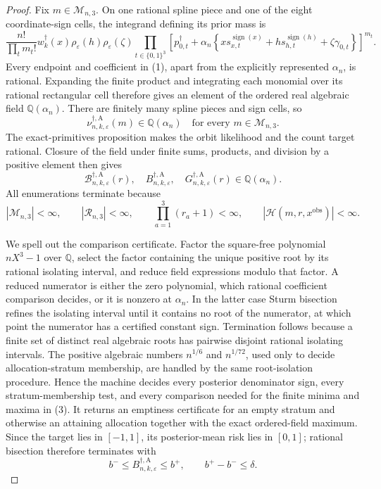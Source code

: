 \documentclass{article}
\begin{document}
{\begin{proof}
Fix \(m\in\mathcal M_{n,3}\).  On one rational spline piece and one of the eight
coordinate-sign cells, the integrand defining its prior mass is
\[
 \frac{n!}{\prod_tm_t!}
 w_k^\dagger(x)\rho_\varepsilon(h)\rho_\varepsilon(\zeta)
 \prod_{t\in\{0,1\}^3}
 \left[p_{0,t}^\dagger+\alpha_n
 \left\{xs_{x,t}^{\operatorname{sign}(x)}
 +hs_{h,t}^{\operatorname{sign}(h)}+\zeta\gamma_{0,t}\right\}
 \right]^{m_t}.
\tag{1}
\]
Every endpoint and coefficient in (1), apart from the explicitly represented
\(\alpha_n\), is rational.  Expanding the finite product and integrating each
monomial over its rational rectangular cell therefore gives an element of the
ordered real algebraic field \(\mathbb Q(\alpha_n)\).  There are finitely many
spline pieces and sign cells, so
\[
 \nu_{n,k,\varepsilon}^{\dagger,\mathrm A}(m)
 \in\mathbb Q(\alpha_n)
 \quad\text{for every }m\in\mathcal M_{n,3}.
\tag{2}
\]
The exact-primitives proposition makes the orbit likelihood and the count target
rational.  Closure of the field under finite sums, products, and division by a
positive element then gives
\[
 \mathcal B_{n,k,\varepsilon}^{\dagger,\mathrm A}(r),\quad
 B_{n,k,\varepsilon}^{\dagger,\mathrm A},\quad
 G_{n,k,\varepsilon}^{\dagger,\mathrm A}(r)
 \in\mathbb Q(\alpha_n).
\tag{3}
\]
All enumerations terminate because
\[
 |\mathcal M_{n,3}|<\infty,
 \qquad |\mathcal R_{n,3}|<\infty,
 \qquad \prod_{a=1}^3(r_a+1)<\infty,
 \qquad |\mathcal H(m,r,x^{\mathrm{obs}})|<\infty.
\tag{4}
\]

We spell out the comparison certificate.  Factor the square-free polynomial
\(nX^3-1\) over \(\mathbb Q\), select the factor containing the unique positive
root by its rational isolating interval, and reduce field expressions modulo that
factor.  A reduced numerator is either the zero polynomial, which rational
coefficient comparison decides, or it is nonzero at \(\alpha_n\).  In the latter
case Sturm bisection refines the isolating interval until it contains no root of the
numerator, at which point the numerator has a certified constant sign.  Termination
follows because a finite set of distinct real algebraic roots has pairwise disjoint
rational isolating intervals.  The positive algebraic numbers \(n^{1/6}\) and
\(n^{1/72}\), used only to decide allocation-stratum membership, are handled by
the same root-isolation procedure.  Hence the machine decides every posterior
denominator sign, every stratum-membership test, and every comparison needed for
the finite minima and maxima in (3).  It returns an emptiness certificate for an
empty stratum and otherwise an attaining allocation together with the exact
ordered-field maximum.  Since the target lies in \([-1,1]\), its posterior-mean
risk lies in \([0,1]\); rational bisection therefore terminates with
\[
 b^-\le B_{n,k,\varepsilon}^{\dagger,\mathrm A}\le b^+,
 \qquad b^+-b^-\le\delta.
\tag{5}
\]


\end{proof}}
\end{document}
